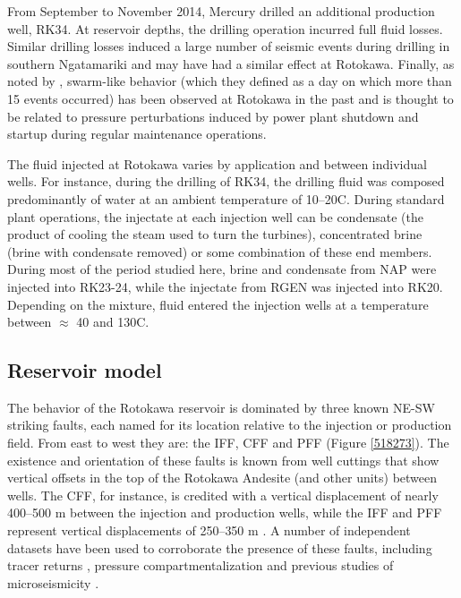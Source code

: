 From September to November 2014, Mercury drilled an additional production well, RK34. At reservoir depths, the drilling operation incurred full fluid losses. Similar drilling losses induced a large number of seismic events during drilling in southern Ngatamariki \citep{j2019} and may have had a similar effect at Rotokawa. Finally, as noted by \citet{Sewell_2015WGC}, swarm-like behavior (which they defined as a day on which more than 15 events occurred) has been observed at Rotokawa in the past and is thought to be related to pressure perturbations induced by power plant shutdown and startup during regular maintenance operations.

The fluid injected at Rotokawa varies by application and between individual wells. For instance, during the drilling of RK34, the drilling fluid was composed predominantly of water at an ambient temperature of 10--20\textdegree C. During standard plant operations, the injectate at each injection well can be condensate (the product of cooling the steam used to turn the turbines), concentrated brine (brine with condensate removed) or some combination of these end members. During most of the period studied here, brine and condensate from NAP were injected into RK23-24, while the injectate from \acrshort{RGEN} was injected into RK20. Depending on the mixture, fluid entered the injection wells at a temperature between $\approx{}$ 40 and 130\textdegree C.

\subsection{Reservoir model}\label{model}
The behavior of the Rotokawa reservoir is dominated by three known NE-SW striking faults, each named for its location relative to the injection or production field. From east to west they are: the \acrfull{IFF}, \acrfull{CFF} and \acrfull{PFF} \citep{wallis2013} (Figure \ref{518273}). The existence and orientation of these faults is known from well cuttings that show vertical offsets in the top of the Rotokawa Andesite (and other units) between wells. The \acrshort{CFF}, for instance, is credited with a vertical displacement of nearly 400--500 m between the injection and production wells, while the \acrshort{IFF} and \acrshort{PFF} represent vertical displacements of 250--350 m \citep{wallis2013}. A number of independent datasets have been used to corroborate the presence of these faults, including tracer returns \citep{addison2015rotokawa,Addison_2017stanford}, pressure compartmentalization \citep{Quinao_2013stanford,Sewell_2015} and previous studies of microseismicity \citep{Sherburn_2015,Sewell_2015WGC}.

